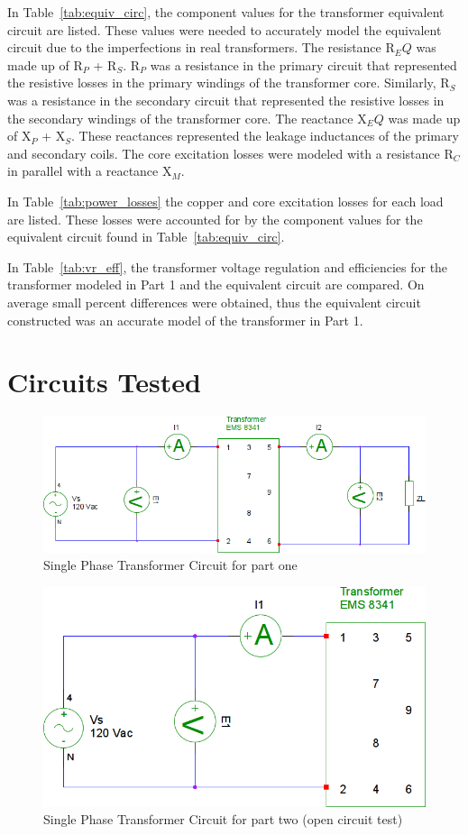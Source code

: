 \documentclass{article}
\begin{document}
In Table~\ref{tab:equiv_circ}, the component values for the transformer equivalent circuit are listed. These
values were needed to accurately model the equivalent circuit due to the imperfections in real transformers. The
resistance R$_EQ$ was made up of R$_P$ + R$_S$. R$_P$ was a resistance in the primary circuit that represented the 
resistive losses in the primary windings of the transformer core. Similarly, R$_S$ was a resistance in the secondary
circuit that represented the resistive losses in the secondary windings of the transformer core. The reactance X$_EQ$
was made up of X$_P$ + X$_S$. These reactances represented the leakage inductances of the primary and secondary coils.
The core excitation losses were modeled with a resistance R$_C$ in parallel with a reactance X$_M$. 

In Table~\ref{tab:power_losses} the copper and core excitation losses for each load are listed. These losses were
accounted for by the component values for the equivalent circuit found in Table~\ref{tab:equiv_circ}.

In Table~\ref{tab:vr_eff}, the transformer voltage regulation and efficiencies for the transformer modeled in Part 1
and the equivalent circuit are compared. On average small percent differences were obtained, thus the equivalent 
circuit constructed was an accurate model of the transformer in Part 1.

\section*{Circuits Tested}
\begin{figure}[H]
  \centering
  \includegraphics[width=.8\textwidth]{img/circuit_01}
  \caption{Single Phase Transformer Circuit for part one}
  \label{fig:circuit_01}
\end{figure}

\begin{figure}[H]
  \centering
  \includegraphics[width=.8\textwidth]{img/circuit_02}
  \caption{Single Phase Transformer Circuit for part two (open circuit test)}
  \label{fig:circuit_02}
\end{figure}
\end{document}
